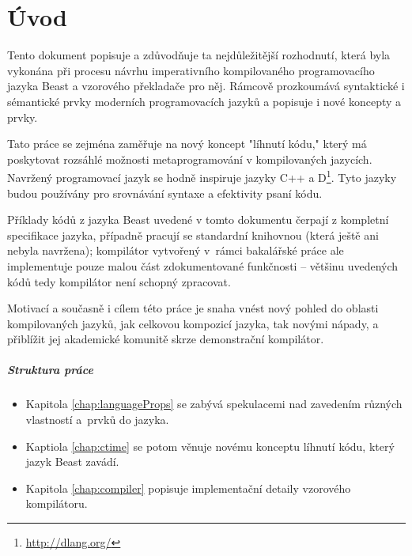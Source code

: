 
\newcommand{\ctimeNoXSpace}{\inlineCode{@ctime}}
\newcommand{\ctime}{\ctimeNoXSpace\xspace}
\newcommand{\nonctime}{ne-\inlineCode{@ctime}\xspace}

\renewcommand\chapterautorefname{kapitola}
\renewcommand\sectionautorefname{podkapitola}
\renewcommand\subsectionautorefname{oddíl}
\renewcommand\subsubsectionautorefname{pododdíl}

\chapter{Úvod}
Tento dokument popisuje a zdůvodňuje ta nejdůležitější rozhodnutí, která byla vykonána při procesu návrhu imperativního kompilovaného programovacího jazyka Beast a vzorového překladače pro něj. Rámcově prozkoumává syntaktické i sémantické prvky moderních programovacích jazyků a popisuje i nové koncepty a prvky.

Tato práce se zejména zaměřuje na nový koncept "líhnutí kódu," který má poskytovat rozsáhlé možnosti metaprogramování v kompilovaných jazycích. Navržený programovací jazyk se hodně inspiruje jazyky C++ a D\footnote{\url{http://dlang.org/}}. Tyto jazyky budou používány pro srovnávání syntaxe a efektivity psaní kódu.

Příklady kódů z jazyka Beast uvedené v tomto dokumentu čerpají z kompletní specifikace jazyka, případně pracují se standardní knihovnou (která ještě ani nebyla navržena); kompilátor vytvořený v~rámci bakalářské práce ale implementuje pouze malou část zdokumentované funkčnosti -- většinu uvedených kódů tedy kompilátor není schopný zpracovat.

Motivací a současně i cílem této práce je snaha vnést nový pohled do oblasti kompilovaných jazyků, jak celkovou kompozicí jazyka, tak novými nápady, a přiblížit jej akademické komunitě skrze demonstrační kompilátor.

\paragraph{Struktura práce}
\begin{itemize}
	\item Kapitola \ref{chap:languageProps} se zabývá spekulacemi nad zavedením různých vlastností a~prvků do jazyka.
	\item Kaptiola \ref{chap:ctime} se potom věnuje novému konceptu líhnutí kódu, který jazyk Beast zavádí.
	\item Kapitola \ref{chap:compiler} popisuje implementační detaily vzorového kompilátoru.
\end{itemize}

